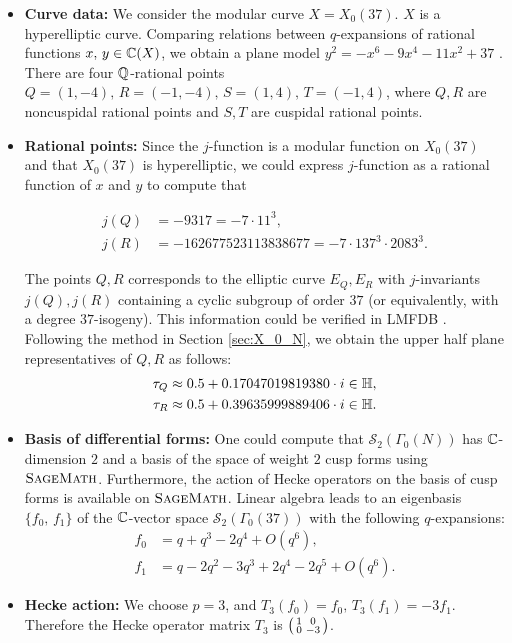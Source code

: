 \begin{itemize}
\item \textbf{Curve data: } We consider the modular curve $X = X_0(37)$. $X$ is a hyperelliptic curve. Comparing relations between $q$-expansions of rational functions $x,\,y \in \mathbb{C}(X)$, we obtain a plane model $y^2 = - x^6 - 9x^4 - 11x^2 + 37$ \cite{maswd}. There are four $\mathbb{Q}$-rational points $Q = (1,-4),\,R = (-1,-4),\, S=(1,4),\,T = (-1,4)$, where $Q,R$ are noncuspidal rational points and $S,T$ are cuspidal rational points.

\item \textbf{Rational points:}  Since the $j$-function is a
modular function on $X_0(37)$ and that $X_0(37)$ is hyperelliptic, we could
express $j$-function as a rational function of $x$ and $y$ to compute
that

\begin{align*}
  j(Q) &= -9317 = - 7 \cdot 11^3, \\
  j(R) &= -162677523113838677= - 7 \cdot 137^3 \cdot 2083^3.
\end{align*}
          

The points $Q,R$ corresponds to the elliptic curve $E_Q,E_R$ with
$j$-invariants $j(Q),j(R)$ containing a cyclic subgroup of order $37$ (or equivalently, with a degree $37$-isogeny). This information could be verified in LMFDB \cite{lmfdb}. Following the method in Section \ref{sec:X_0_N}, we obtain the upper half plane representatives of $Q,R$ as follows: \begin{align*} \tau_Q &\approx 0.5 + 0.17047019819380\cdot i \in \mathbb{H} , \\ \tau_R &\approx 0.5 + 0.39635999889406\cdot i \in \mathbb{H}. \end{align*} 


\item \textbf{Basis of differential forms:} One could compute that $\mathcal{S}_2(\Gamma_0(N))$ has $\mathbb{C}$-dimension $2$ and a basis of the space of weight $2$ cusp forms using $\textsc{SageMath}$. Furthermore, the action of Hecke operators on the basis of cusp forms is available on $\textsc{SageMath}$. Linear algebra leads to an eigenbasis $\{f_0,\,f_1\}$ of the $\mathbb{C}$-vector space $\mathcal{S}_2(\Gamma_0(37))$ with the following $q$-expansions:
\begin{align*} f_0 &= q+q^3-2q^4+O(q^6), \\ f_1 &= q-2q^2-3q^3+2q^4-2q^5+O(q^6) .\end{align*}

\item \textbf{Hecke action:} We choose $p=3$, and $T_3(f_0) = f_0,\,T_3(f_1) = -3f_1$. Therefore the Hecke operator matrix $T_3$ is $\begin{psmallmatrix}
1&0\\
0&-3
\end{psmallmatrix}$. 


\end{itemize}
